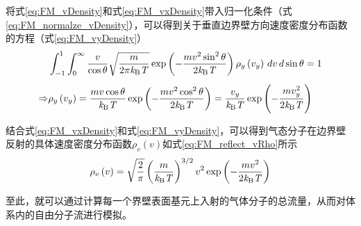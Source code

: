     将式\eqref{eq:FM_vDensity}和式\eqref{eq:FM_vxDensity}带入归一化条件（式\eqref{eq:FM_normalze_vDensity}），可以得到关于垂直边界壁方向速度密度分布函数的方程（式\eqref{eq:FM_vyDensity}）\chinesecolon
    \begin{equation}
        \label{eq:FM_vyDensity}
        \begin{split}
            & \int_{-1}^{1} \int_{0}^{\infty} \frac{v}{\cos\theta} \sqrt{\frac{m}{2\pi\it k_{\rm B} \it T}}\exp\left({-\frac{mv^2\sin^2\theta}{2\it k_{\rm B} \it T}}\right)\rho_y\left(v_y\right) \,dv  \,d\sin\theta =1\\[+1ex]
\Rightarrow & \rho_y\left(v_y\right)=\frac{mv\cos\theta}{\it k_{\rm B} \it T}\exp\left({-\frac{mv^2\cos^2\theta}{2\it k_{\rm B} \it T}}\right)=\frac{v_y}{\it k_{\rm B} \it T}\exp\left(-\frac{mv_y^2}{2\it k_{\rm B} \it T}\right)
        \end{split}
    \end{equation}

    结合式\eqref{eq:FM_vxDensity}和式\eqref{eq:FM_vyDensity}，可以得到气态分子在边界壁反射的具体速度密度分布函数$\rho_v\left(v\right)$如式\eqref{eq:FM_reflect_vRho}所示\chinesecolon
    \begin{equation}
        \label{eq:FM_reflect_vRho}
        \rho_v\left(v\right)=\sqrt{\frac{2}{\pi}} \left(\frac{m}{\it k_{\rm B} \it T}\right)^{3/ 2}v^2\exp{\left(-\frac{mv^2}{2\it k_{\rm B} \it T}\right)}
    \end{equation}

    至此，就可以通过计算每一个界壁表面基元上入射的气体分子的总流量，从而对体系内的自由分子流进行模拟。